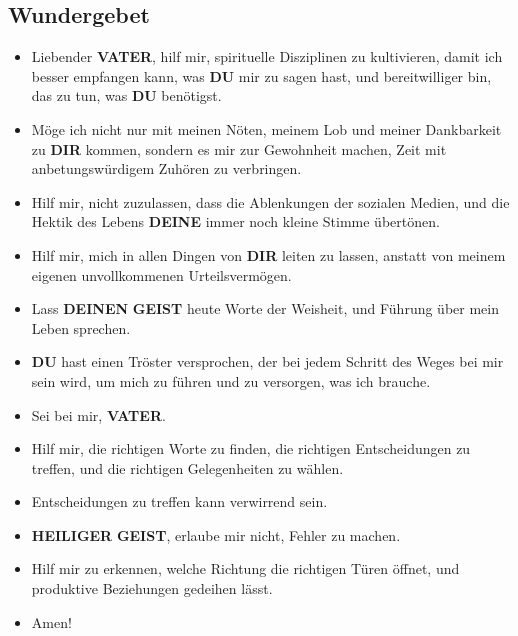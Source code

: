 \documentclass[10pt,a5paper]{article}
\newcommand{\Deinen}[0]{\textbf{DEINEN}}
\newcommand{\Deine}[0]{\textbf{DEINE}}
\newcommand{\Dir}[0]{\textbf{DIR}}
\newcommand{\Du}[0]{\textbf{DU}}
\newcommand{\Geist}[0]{\textbf{GEIST}}
\newcommand{\Heiliger}[0]{\textbf{HEILIGER}}
\newcommand{\Vater}[0]{\textbf{VATER}}
\begin{document}
	\subsection{Wundergebet}
		\begin{itemize}[nosep]
			\item	Liebender {\Vater},
					hilf mir,
					spirituelle Disziplinen zu kultivieren,
					damit ich besser empfangen kann,
					was {\Du} mir zu sagen hast,
					und bereitwilliger bin,
					das zu tun,
					was {\Du} ben\"otigst.
			\item	M\"oge ich nicht nur mit meinen N\"oten,
					meinem Lob und meiner Dankbarkeit zu {\Dir} kommen,
					sondern es mir zur Gewohnheit machen,
					Zeit mit anbetungsw\"urdigem Zuh\"oren zu verbringen.
			\item	Hilf mir,
					nicht zuzulassen,
					dass die Ablenkungen der sozialen Medien,
					und die Hektik des Lebens {\Deine} immer noch kleine Stimme \"ubert\"onen.
			\item	Hilf mir,
					mich in allen Dingen von {\Dir} leiten zu lassen,
					anstatt von meinem eigenen unvollkommenen Urteilsverm\"ogen.
			\item	Lass {\Deinen} {\Geist} heute Worte der Weisheit,
					und F\"uhrung \"uber mein Leben sprechen.
			\item	{\Du} hast einen Tr\"oster versprochen,
					der bei jedem Schritt des Weges bei mir sein wird,
					um mich zu f\"uhren und zu versorgen,
					was ich brauche.
			\item	Sei bei mir,
					{\Vater}.
			\item	Hilf mir,
					die richtigen Worte zu finden,
					die richtigen Entscheidungen zu treffen,
					und die richtigen Gelegenheiten zu w\"ahlen.
			\item	Entscheidungen zu treffen kann verwirrend sein.
			\item	{\Heiliger} {\Geist},
					erlaube mir nicht,
					Fehler zu machen.
			\item	Hilf mir zu erkennen,
					welche Richtung die richtigen T\"uren \"offnet,
					und produktive Beziehungen gedeihen l\"asst.
			\item	Amen!
		\end{itemize}
\end{document}
